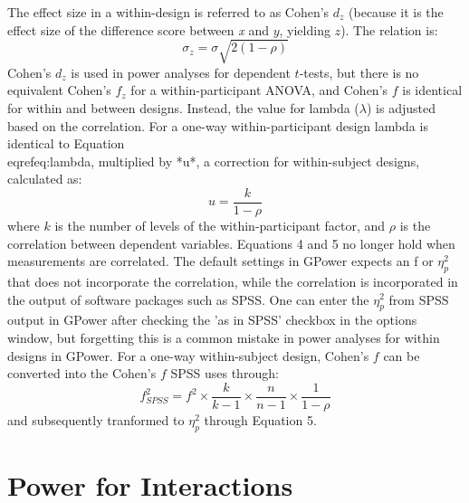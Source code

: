 \documentclass[,man,floatsintext]{apa6}
\begin{document}
\begin{tcolorbox}[colback=black!5!white,colframe=white!5!black,title=Box 2. Formula for effect sizes for within designs]
The effect size in a within-design is referred to as Cohen's $d_z$ (because it is the effect size of the difference score between \textit{x} and $y$, yielding $z$). The relation is:
\begin{equation}
\sigma_{z}=\sigma\sqrt{2(1-\rho)}
\end{equation}
Cohen's $d_z$ is used in power analyses for dependent $t$-tests, but there is no equivalent Cohen's $f_z$ for a within-participant ANOVA, and Cohen's $f$ is identical for within and between designs. 
Instead, the value for lambda ($\lambda$) is adjusted based on the correlation. 
For a one-way within-participant design lambda is identical to Equation \\eqref{eq:lambda}, multiplied by *u*, a correction for within-subject designs, calculated as:
\begin{equation}
u = \frac{k}{1-\rho}
\end{equation}
where $k$ is the number of levels of the within-participant factor, and $\rho$ is the correlation between dependent variables.
Equations 4 and 5 no longer hold when measurements are correlated.
The default settings in G\*Power expects an f or $\eta_p^2$ that does not incorporate the correlation, while the correlation is incorporated in the output of software packages such as SPSS. 
One can  enter the $\eta_p^2$ from SPSS output in G\*Power after checking the 'as in SPSS' checkbox in the options window, but forgetting this is a common mistake in power analyses for within designs in G\*Power.
For a one-way within-subject design, Cohen's $f$ can be converted into the Cohen's $f$ SPSS uses through:
\begin{equation}
f^2_{SPSS} = f^2 \times \frac{k}{k-1} \times \frac{n}{n-1} \times \frac{1}{1-\rho}
\end{equation}
and subsequently tranformed to $\eta_p^2$ through Equation 5.
\end{tcolorbox}

\hypertarget{power-for-interactions}{%
\section{Power for Interactions}\label{power-for-interactions}}
\end{document}
